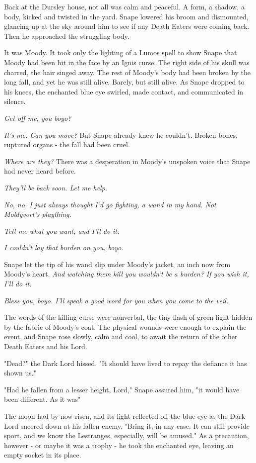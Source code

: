 Back at the Dursley house, not all was calm and peaceful. A form, a shadow, a body, kicked and twisted in the yard. Snape lowered his broom and dismounted, glancing up at the sky around him to see if any Death Eaters were coming back. Then he approached the struggling body.

It was Moody. It took only the lighting of a Lumos spell to show Snape that Moody had been hit in the face by an Ignis curse. The right side of his skull was charred, the hair singed away. The rest of Moody's body had been broken by the long fall, and yet he was still alive. Barely, but still alive. As Snape dropped to his knees, the enchanted blue eye swirled, made contact, and communicated in silence.

\emph{Get off me, you{\el} boyo?}

\emph{It's me. Can you move?} But Snape already knew he couldn't. Broken bones, ruptured organs - the fall had been cruel.

\emph{Where are they?} There was a desperation in Moody's unspoken voice that Snape had never heard before.

\emph{They'll be back soon. Let me help.}

\emph{No, no. I just always thought I'd go fighting, a wand in my hand. Not Moldyvort's plaything.}

\emph{Tell me what you want, and I'll do it.}

\emph{I couldn't lay that burden on you, boyo.}

Snape let the tip of his wand slip under Moody's jacket, an inch now from Moody's heart. \emph{And watching them kill you wouldn't be a burden? If you wish it, I'll do it.}

\emph{Bless you, boyo. I'll speak a good word for you when you come to the veil.}

The words of the killing curse were nonverbal, the tiny flash of green light hidden by the fabric of Moody's coat. The physical wounds were enough to explain the event, and Snape rose slowly, calm and cool, to await the return of the other Death Eaters and his Lord.

\sbreak

"Dead?" the Dark Lord hissed. "It should have lived to repay the defiance it has shown us."

"Had he fallen from a lesser height, Lord," Snape assured him, "it would have been different. As it was{\el}"

The moon had by now risen, and its light reflected off the blue eye as the Dark Lord sneered down at his fallen enemy. "Bring it, in any case. It can still provide sport, and we know the Lestranges, especially, will be amused." As a precaution, however - or maybe it was a trophy - he took the enchanted eye, leaving an empty socket in its place.

